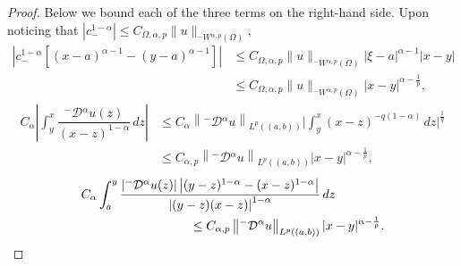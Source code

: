 \documentclass[leqno,final]{siamltex}
\numberwithin{equation}{section}
\renewcommand{\(}{\bigl(}
\renewcommand{\)}{\bigr)}
\begin{document}
\begin{proof}
           Below we bound each of the three terms on the right-hand side.
           Upon noticing that $|c_{-}^{1-\alpha}| \leq C_{\Omega,\alpha ,p} \|u\|_{{^{-}}{W}{^{\alpha,p}}(\Omega)}$, 
            \begin{align}\label{a2}
            \left|c_{-}^{1-\alpha} [ (x-a)^{\alpha -1} - (y-a)^{\alpha -1} ]\right| 
            &\leq C_{\Omega , \alpha , p} \|u\|_{{^{-}}{W}{^{\alpha,p}}(\Omega)} |\xi - a|^{\alpha -1} |x-y|\\
            &\leq C_{\Omega,\alpha,p} \|u\|_{{^{-}}{W}{^{\alpha,p}}(\Omega)} |x-y|^{\alpha - \frac{1}{p}}, \nonumber
            \end{align}
            \begin{align}\label{a3}
            C_{\alpha} \left|\int_{y}^{x} \dfrac{{^{-}}{\mathcal{D}}{^{\alpha}}u(z)}{(x-z)^{1-\alpha}}\,dz \right|
            &\leq C_{\alpha} \left\| {^{-}}{\mathcal{D}}{^{\alpha}} u \right\|_{L^{p}((a,b))} \biggl| \int_{y}^{x} (x-z)^{-q(1-\alpha)}\,dz \biggl|^{\frac{1}{q}} \\
            &\leq C_{\alpha , p} \left\|{^{-}}{\mathcal{D}}{^{\alpha}} u \right\|_{L^{p}((a,b))} |x-y|^{\alpha-\frac{1}{p}}, \nonumber
            \end{align}
            \begin{align}\label{a4}
            & C_{\alpha}  \int_{a}^{y} \dfrac{\left|{^{-}}{\mathcal{D}}{^{\alpha}} u(z)\right| \left|(y-z)^{1-\alpha} - (x-z)^{1-\alpha}\right|}{\left|(y-z)(x-z)\right|^{1 - \alpha}}\,dz\\
            &\hskip 1.2in \leq C_{\alpha,p} \left\| {^{-}}{\mathcal{D}}{^{\alpha}} u \right\|_{L^{p}((a,b))} |x-y|^{\alpha- \frac{1}{p}}. \nonumber
            \end{align}

\end{proof}
\end{document}
